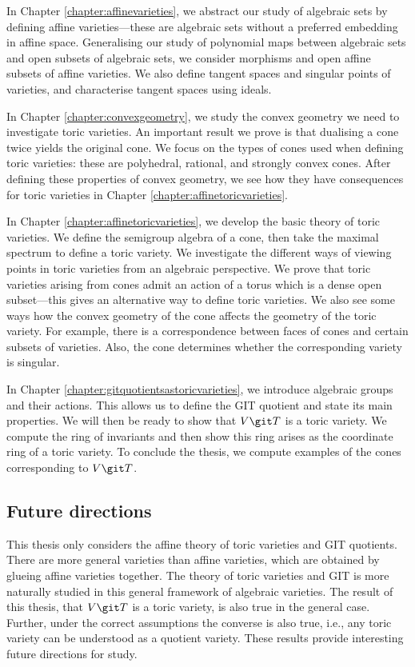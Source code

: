 \documentclass[12pt]{amsart}
\theoremstyle{plain}
\theoremstyle{definition}
\begin{document}
In Chapter \ref{chapter:affinevarieties}, we abstract our study of algebraic sets by defining affine varieties---these are algebraic sets without a preferred embedding in affine space.
Generalising our study of polynomial maps between algebraic sets and open subsets of algebraic sets, we consider morphisms and open affine subsets of affine varieties.
We also define tangent spaces and singular points of varieties, and characterise tangent spaces using ideals.

In Chapter \ref{chapter:convexgeometry}, we study the convex geometry we need to investigate toric varieties.
An important result we prove is that dualising a cone twice yields the original cone.
We focus on the types of cones used when defining toric varieties: these are polyhedral, rational, and strongly convex cones.
After defining these properties of convex geometry, we see how they have consequences for toric varieties in Chapter \ref{chapter:affinetoricvarieties}.

In Chapter \ref{chapter:affinetoricvarieties}, we develop the basic theory of toric varieties.
We define the semigroup algebra of a cone, then take the maximal spectrum to define a toric variety.
We investigate the different ways of viewing points in toric varieties from an algebraic perspective.
We prove that toric varieties arising from cones admit an action of a torus which is a dense open subset---this gives an alternative way to define toric varieties.
We also see some ways how the convex geometry of the cone affects the geometry of the toric variety.
For example, there is a correspondence between faces of cones and certain subsets of varieties. 
Also, the cone determines whether the corresponding variety is singular.

In Chapter \ref{chapter:gitquotientsastoricvarieties}, we introduce algebraic groups and their actions.
This allows us to define the GIT quotient and state its main properties.
We will then be ready to show that $V \git T$ is a toric variety.
We compute the ring of invariants and then show this ring arises as the coordinate ring of a toric variety.
To conclude the thesis, we compute examples of the cones corresponding to $V \git T$.

\subsection*{Future directions}
This thesis only considers the affine theory of toric varieties and GIT quotients.
There are more general varieties than affine varieties, which are obtained by glueing affine varieties together.
The theory of toric varieties and GIT is more naturally studied in this general framework of algebraic varieties.
The result of this thesis, that $V \git T$ is a toric variety, is also true in the general case.
Further, under the correct assumptions the converse is also true, i.e., any toric variety can be understood as a quotient variety.
These results provide interesting future directions for study.
\end{document}
